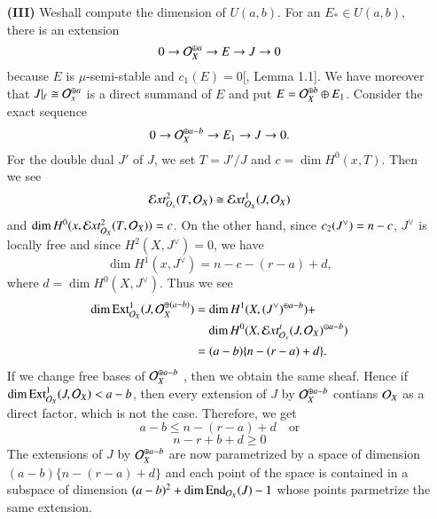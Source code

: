 \begin{itemize}
\item[{\bf(III)}] We\pageoriginale shall compute the dimension of $U(a,b)$. For an $E_{*} \in U(a, b)$, there is an extension
$$
0 \rightarrow \mathcal{O}_{X}^{\oplus a} \rightarrow E \rightarrow J \rightarrow 0
$$
because $E$ is $\mu$-semi-stable and $c_{1}(E) =0$[\cite{chap12-key6}, Lemma 1.1]. We have moreover that $ J|_{\ell}\cong \mathcal{O}_{x}^{\oplus a}$ is a direct summand of $E$ and put $E=\mathcal{O}_{X}^{\oplus b} \oplus E_{1}$. Consider the exact sequence
$$
0\rightarrow \mathcal{O}_{X}^{\oplus a-b} \rightarrow E_{1} \rightarrow J \rightarrow 0.
$$
For the double dual $J'$ of $J$, we set $T= J'/J$ and $c =\dim H^{0}(x, T)$. Then we see
$$
\mathcal{E} xt_{O_{x}}^{2} (T, \mathcal{O}_{X})\cong  \mathcal{E} xt_{\mathcal{O}_{X}}^{1} (J, \mathcal{O}_{X})
$$
and $\dim H^{0}(x, \mathcal{E} xt_{\mathcal{O}_{X}}^{2} (T, \mathcal{O}_{X}))=c$. On the other hand, since $c_{2}(J^{\vee})\break =n-c$, $J^{\vee}$ is locally free and since $H^{2}(X, J^{\vee})=0$, we have
$$
\dim H^{1}(x, J^{\vee}) = n-c-(r-a) +d,
$$
where $d=\dim H^{0}(X, J^{\vee})$. Thus we see
\begin{equation*}
\begin{split}
\dim \operatorname{Ext}_{\mathcal{O}_{X}}^{1}(J, \mathcal{O}_{X}^{\oplus (a-b)})& = \dim H^{1}(X, (J^{\vee})^{\oplus a-b}) +\\
            &\quad \dim H^{0}(X, \mathcal{E} xt_{\mathcal{O}_{x}}^{t}(J, \mathcal{O}_{X})^{\oplus a-b})\\
            &= (a-b) \{n-(r-a) + d \}.            
\end{split}
\end{equation*}
If we change free bases of $\mathcal{O}_{X}^{\oplus a-b}$ , then we obtain the same sheaf. Hence if $\dim \operatorname{Ext}_{\mathcal{O}_{X}}^{1} (J, \mathcal{O}_{X}) < a-b$, then every extension of $J$ by $\mathcal{O}_{X}^{\oplus a-b}$ contians $\mathcal{O}_{X}$ as a direct factor, which is not the case. Therefore, we get
$$
a-b \leq n-(r-a)+d \quad \text{or}
$$
$$
n-r + b + d \geq 0
$$
The extensions of $J$ by $\mathcal{O}_{X}^{\oplus a-b}$ are now parametrized by a space of dimension $(a-b)\{n-(r-a) + d\}$ and each point of the space is contained in a subspace of dimension $(a-b)^{2} + \dim \operatorname{End}_{\mathcal{O}_{X}}(J)-1$ whose points parmetrize the same extension.


\end{itemize}
